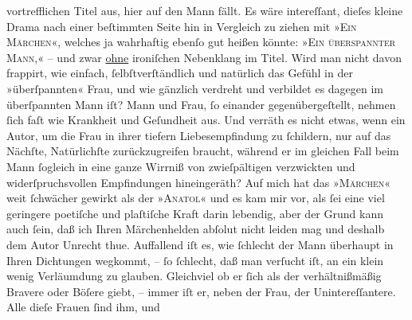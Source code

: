\begin{ledgroupsized}[t]{13cm}
                    vortrefflichen Titel aus, hier auf den Mann fällt. Es wäre intereſſant, dieſes
                    kleine Drama nach einer beſtimmten Seite hin in Vergleich zu ziehen mit
                        »\textsc{Ein Märchen}«, welches ja wahrhaftig ebenſo gut heißen könnte: »\textsc{Ein überspannter Mann},« – und zwar \uline{ohne} ironiſchen Nebenklang im Titel. Wird man nicht
                    davon frappirt, wie einfach, ſelbſtverſtändlich und natürlich das Gefühl in der
                    »überſpannten« Frau, und wie gänzlich verdreht und verbildet es dagegen im
                    überſpannten Mann iſt? Mann und Frau, ſo einander gegenübergeſtellt, nehmen ſich
                    faſt wie Krankheit und Geſundheit aus. Und verräth es nicht etwas, wenn ein Autor, um die Frau in ihrer tiefern
                    Liebesempfindung zu ſchildern, nur auf das Nächſte, Natürlichſte zurückzugreifen
                    braucht, während er im gleichen Fall beim Mann ſogleich in {\pb}eine ganze Wirrniß von zwieſpältigen
                    verzwickten und widerſpruchsvollen Empfindungen hineingeräth? Auf mich hat das
                        »\textsc{Märchen}« weit ſchwächer gewirkt als der »\textsc{Anatol}« und es kam mir vor, als ſei eine viel geringere poetiſche und
                    plaſtiſche Kraft darin lebendig, aber der Grund kann auch ſein, daß ich Ihren
                    Märchenhelden abſolut nicht leiden mag und deshalb dem Autor Unrecht thue.
                    Auffallend iſt es, wie ſchlecht der Mann überhaupt in Ihren Dichtungen wegkommt,
                    – ſo ſchlecht, daß man verſucht iſt, an ein klein wenig Verläumdung zu glauben.
                    Gleichviel ob er ſich als der verhältnißmäßig Bravere oder Böſere giebt, – immer
                    iſt er, neben der Frau, der Unintereſſantere. Alle dieſe Frauen ſind ihm, und

\end{ledgroupsized}
